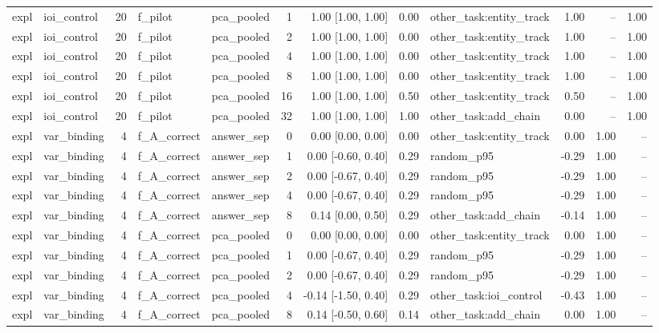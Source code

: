 \begin{tabular}{llrllrrrlrrr}
expl & ioi\_control & 20 & f\_pilot & pca\_pooled & 1 & 1.00 [1.00, 1.00] & 0.00 & other\_task:entity\_track & 1.00 & -- & 1.00 \\
expl & ioi\_control & 20 & f\_pilot & pca\_pooled & 2 & 1.00 [1.00, 1.00] & 0.00 & other\_task:entity\_track & 1.00 & -- & 1.00 \\
expl & ioi\_control & 20 & f\_pilot & pca\_pooled & 4 & 1.00 [1.00, 1.00] & 0.00 & other\_task:entity\_track & 1.00 & -- & 1.00 \\
expl & ioi\_control & 20 & f\_pilot & pca\_pooled & 8 & 1.00 [1.00, 1.00] & 0.00 & other\_task:entity\_track & 1.00 & -- & 1.00 \\
expl & ioi\_control & 20 & f\_pilot & pca\_pooled & 16 & 1.00 [1.00, 1.00] & 0.50 & other\_task:entity\_track & 0.50 & -- & 1.00 \\
expl & ioi\_control & 20 & f\_pilot & pca\_pooled & 32 & 1.00 [1.00, 1.00] & 1.00 & other\_task:add\_chain & 0.00 & -- & 1.00 \\
expl & var\_binding & 4 & f\_A\_correct & answer\_sep & 0 & 0.00 [0.00, 0.00] & 0.00 & other\_task:entity\_track & 0.00 & 1.00 & -- \\
expl & var\_binding & 4 & f\_A\_correct & answer\_sep & 1 & 0.00 [-0.60, 0.40] & 0.29 & random\_p95 & -0.29 & 1.00 & -- \\
expl & var\_binding & 4 & f\_A\_correct & answer\_sep & 2 & 0.00 [-0.67, 0.40] & 0.29 & random\_p95 & -0.29 & 1.00 & -- \\
expl & var\_binding & 4 & f\_A\_correct & answer\_sep & 4 & 0.00 [-0.67, 0.40] & 0.29 & random\_p95 & -0.29 & 1.00 & -- \\
expl & var\_binding & 4 & f\_A\_correct & answer\_sep & 8 & 0.14 [0.00, 0.50] & 0.29 & other\_task:add\_chain & -0.14 & 1.00 & -- \\
expl & var\_binding & 4 & f\_A\_correct & pca\_pooled & 0 & 0.00 [0.00, 0.00] & 0.00 & other\_task:entity\_track & 0.00 & 1.00 & -- \\
expl & var\_binding & 4 & f\_A\_correct & pca\_pooled & 1 & 0.00 [-0.67, 0.40] & 0.29 & random\_p95 & -0.29 & 1.00 & -- \\
expl & var\_binding & 4 & f\_A\_correct & pca\_pooled & 2 & 0.00 [-0.67, 0.40] & 0.29 & random\_p95 & -0.29 & 1.00 & -- \\
expl & var\_binding & 4 & f\_A\_correct & pca\_pooled & 4 & -0.14 [-1.50, 0.40] & 0.29 & other\_task:ioi\_control & -0.43 & 1.00 & -- \\
expl & var\_binding & 4 & f\_A\_correct & pca\_pooled & 8 & 0.14 [-0.50, 0.60] & 0.14 & other\_task:add\_chain & 0.00 & 1.00 & -- \\

\end{tabular}
